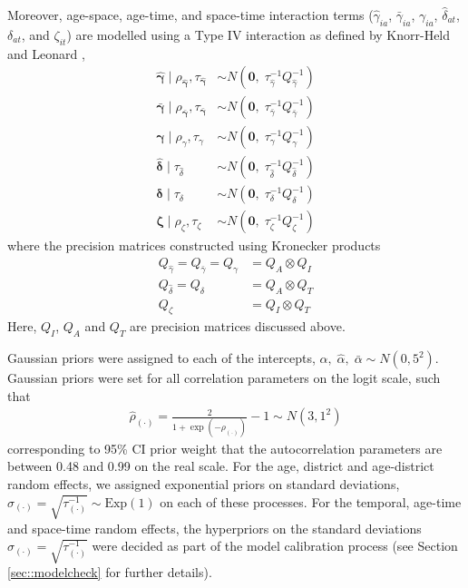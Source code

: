 \documentclass{article}
\begin{document}
\begin{appendix}
Moreover, age-space, age-time, and space-time interaction terms ($\hat{\gamma}_{ia}$, $\bar{\gamma}_{ia}$, $\gamma_{ia}$, $\hat{\delta}_{at}$, $\delta_{at}$, and $\zeta_{it}$) are modelled using a Type IV interaction as defined by Knorr-Held and Leonard \cite{knorr2000bayesian}, 
\begin{align*} 
  \hat{\boldsymbol{\gamma}} \; | \; \rho_{\boldsymbol{\hat{\gamma}}}, \tau_{\boldsymbol{\hat{\gamma}}} &\sim N(\boldsymbol{0}, \;\tau^{-1}_{\hat{\gamma}} Q^{-1}_{\hat{\gamma}}) \\
  \bar{\boldsymbol{\gamma}} \; | \; \rho_{\boldsymbol{\bar{\gamma}}}, \tau_{\boldsymbol{\bar{\gamma}}} &\sim N(\boldsymbol{0}, \;\tau^{-1}_{\bar{\gamma}} Q^{-1}_{\bar{\gamma}}) \\
  \boldsymbol{\gamma} \; | \; \rho_{\gamma}, \tau_{\gamma} &\sim N(\boldsymbol{0}, \;\tau^{-1}_{\gamma} Q^{-1}_{\gamma})\\
  \boldsymbol{\hat{\delta}} \; | \; \tau_{\hat{\delta}} &\sim N(\boldsymbol{0}, \;\tau^{-1}_{\hat{\delta}} Q^{-1}_{\hat{\delta}})\\
  \boldsymbol{\delta} \; | \; \tau_{\delta} &\sim N(\boldsymbol{0}, \;\tau^{-1}_{\delta} Q^{-1}_{\delta})\\
  \boldsymbol{\zeta} \; | \; \rho_{\zeta}, \tau_{\zeta} &\sim N(\boldsymbol{0}, \;\tau^{-1}_{\zeta} Q^{-1}_{\zeta})
\end{align*}
where the precision matrices constructed using Kronecker products 
\begin{align*} 
	Q_{\hat{\gamma}} = Q_{\bar{\gamma}} = Q_{\gamma} &= Q_A \otimes Q_I\\
	Q_{\hat{\delta}} = Q_{\delta} &= Q_A \otimes Q_T\\
	Q_{\zeta} &=Q_I \otimes Q_T
\end{align*}
Here, $Q_I$, $Q_A$ and $Q_T$ are precision matrices discussed above.

Gaussian priors were assigned to each of the intercepts, $\alpha, \;\hat{\alpha}, \;\bar{\alpha} \sim N(0, 5^2)$. Gaussian priors were set for all correlation parameters on the logit scale, such that 
\begin{align*} 
  \hat{\rho}_{(\cdot)} = \frac{2}{1 + \exp(-\rho_{(\cdot)})} - 1 \sim N(3, 1^2)
\end{align*}
corresponding to 95\% CI prior weight that the autocorrelation parameters are between 0.48 and 0.99 on the real scale. For the age, district and age-district random effects, we assigned exponential priors on standard deviations, $\sigma_{(\cdot)} = \sqrt{\tau^{-1}_{(\cdot)}} \sim \text{Exp}(1)$ on each of these processes. For the temporal, age-time and space-time random effects, the hyperpriors on the standard deviations $\sigma_{(\cdot)} = \sqrt{\tau^{-1}_{(\cdot)}}$ were decided as part of the model calibration process (see Section \ref{sec::modelcheck} for further details). 


\end{appendix}
\end{document}
